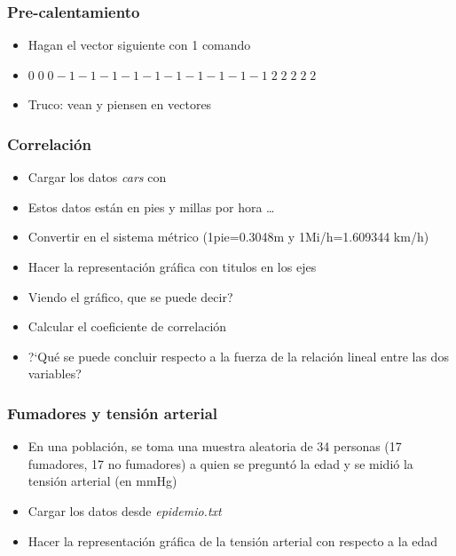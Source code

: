 \documentclass[mathserif]{beamer}
\begin{document}



\begin{frame}[plain,label=d46]%
\frametitle{Pre-calentamiento}
\begin{itemize}
   \item Hagan el vector siguiente con 1 comando
  \item $0\;0\;0-1-1-1-1-1-1-1-1-1-1\;2\;2\;2\;2\;2$
   \item Truco: vean  y piensen en vectores
\end{itemize}
\end{frame}%

\begin{frame}[plain,label=d47]%
\frametitle{Correlaci\'on}
\begin{itemize}
   \item Cargar los datos \emph{cars} con 
   \item Estos datos est\'an en pies y millas por hora \ldots
   \item Convertir en el sistema m\'etrico (1pie=0.3048m y 1Mi/h=1.609344 km/h)
   \item Hacer la representaci\'on gr\'afica con titulos en los ejes
   \item Viendo el gr\'afico, que se puede decir?
   \item Calcular el coeficiente de correlaci\'on
   \item ?`Qu\'e se puede concluir respecto a la fuerza de la relaci\'on lineal entre las dos variables?
\end{itemize}
\end{frame}%

\begin{frame}[plain,label=d48]%
\frametitle{Fumadores y tensi\'on arterial}
\begin{itemize}
   \item En una poblaci\'on, se toma una muestra aleatoria de 34 personas (17 fumadores, 17 no fumadores) a quien se pregunt\'o la edad y se midi\'o la tensi\'on arterial (en mmHg)
   \item Cargar los datos desde \emph{epidemio.txt}
   \item Hacer la representaci\'on gr\'afica de la tensi\'on arterial con respecto a la edad
\end{itemize}
\end{frame}%
\end{document}
